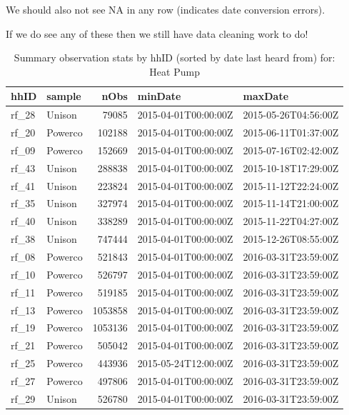 \documentclass[]{article}
\begin{document}
We should also not see NA in any row (indicates date conversion errors).

If we do see any of these then we still have data cleaning work to do!

\begin{table}

\caption{\label{tab:summaryTable}Summary observation stats by hhID (sorted by date last heard from) for: Heat Pump}
\centering
\begin{tabular}[t]{l|l|r|l|l}
\hline
hhID & sample & nObs & minDate & maxDate\\
\hline
rf\_28 & Unison & 79085 & 2015-04-01T00:00:00Z & 2015-05-26T04:56:00Z\\
\hline
rf\_20 & Powerco & 102188 & 2015-04-01T00:00:00Z & 2015-06-11T01:37:00Z\\
\hline
rf\_09 & Powerco & 152669 & 2015-04-01T00:00:00Z & 2015-07-16T02:42:00Z\\
\hline
rf\_43 & Unison & 288838 & 2015-04-01T00:00:00Z & 2015-10-18T17:29:00Z\\
\hline
rf\_41 & Unison & 223824 & 2015-04-01T00:00:00Z & 2015-11-12T22:24:00Z\\
\hline
rf\_35 & Unison & 327974 & 2015-04-01T00:00:00Z & 2015-11-14T21:00:00Z\\
\hline
rf\_40 & Unison & 338289 & 2015-04-01T00:00:00Z & 2015-11-22T04:27:00Z\\
\hline
rf\_38 & Unison & 747444 & 2015-04-01T00:00:00Z & 2015-12-26T08:55:00Z\\
\hline
rf\_08 & Powerco & 521843 & 2015-04-01T00:00:00Z & 2016-03-31T23:59:00Z\\
\hline
rf\_10 & Powerco & 526797 & 2015-04-01T00:00:00Z & 2016-03-31T23:59:00Z\\
\hline
rf\_11 & Powerco & 519185 & 2015-04-01T00:00:00Z & 2016-03-31T23:59:00Z\\
\hline
rf\_13 & Powerco & 1053858 & 2015-04-01T00:00:00Z & 2016-03-31T23:59:00Z\\
\hline
rf\_19 & Powerco & 1053136 & 2015-04-01T00:00:00Z & 2016-03-31T23:59:00Z\\
\hline
rf\_21 & Powerco & 505042 & 2015-04-01T00:00:00Z & 2016-03-31T23:59:00Z\\
\hline
rf\_25 & Powerco & 443936 & 2015-05-24T12:00:00Z & 2016-03-31T23:59:00Z\\
\hline
rf\_27 & Powerco & 497806 & 2015-04-01T00:00:00Z & 2016-03-31T23:59:00Z\\
\hline
rf\_29 & Unison & 526780 & 2015-04-01T00:00:00Z & 2016-03-31T23:59:00Z\\

\end{tabular}
\end{table}
\end{document}
